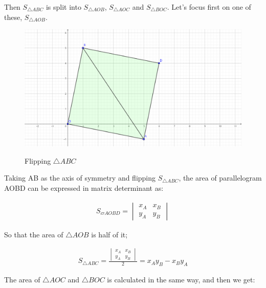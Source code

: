 Then $S_{\triangle ABC}$ is split into $S_{\triangle AOB}$, $S_{\triangle AOC}$ and $S_{\triangle BOC}$. Let’s focus first on one of these, $S_{\triangle AOB}$.

\begin{figure}[H]
\caption{Flipping $\triangle ABC$}
\centering
\includegraphics[scale=0.5]{pic3.png}
\label{fig:label}
\end{figure}

Taking AB as the axis of symmetry and flipping $S_{\triangle ABC}$, the area of parallelogram AOBD can be expressed in matrix determinant as:

\begin{equation}
\begin{split}
S_{\parallelogram AOBD}=\begin{vmatrix}
  x_{A} &x_{B}  \\
  y_{A} &y_{B} 
\end{vmatrix}
\end{split}
\end{equation}

So that the area of $\triangle AOB$ is half of it;

\begin{equation}
\begin{split}
S_{\triangle ABC} =\frac{\begin{vmatrix}
  x_{A} &x_{B}  \\
  y_{A} &y_{B} 
\end{vmatrix}}{2}=x_{A}y_{B}-x_{B}y_{A}  
\end{split}
\end{equation}

The area of $\triangle AOC$ and $\triangle BOC$ is calculated in the same way, and then we get:

